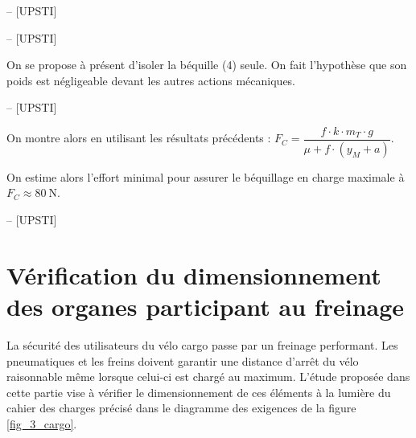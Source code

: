 \ifprof
\begin{corrige}-- [UPSTI]
\end{corrige}
\else
\fi

\ifprof
\begin{corrige}-- [UPSTI]
\end{corrige}
\else
\fi

On se propose à présent d'isoler la béquille (4) seule. On fait l'hypothèse que son poids est négligeable devant les autres actions mécaniques.

\ifprof
\begin{corrige}-- [UPSTI]
\end{corrige}
\else
\fi

On montre alors en utilisant les résultats précédents :
$F_{C}=\dfrac{f \cdot k \cdot m_{T} \cdot g}{\mu+f \cdot\left(y_{M}+a\right)}$.

On estime alors l'effort minimal pour assurer le béquillage en charge maximale à \(F_{C} \approx 80 \mathrm{~N}\).

\ifprof
\begin{corrige}-- [UPSTI]
\end{corrige}
\else
\fi

\section{Vérification du dimensionnement des organes participant au freinage \label{ATS_2024_sec3}}
La sécurité des utilisateurs du vélo cargo passe par un freinage performant. Les pneumatiques et les freins doivent garantir une distance d'arrêt du vélo raisonnable même lorsque celui-ci est chargé au maximum. L'étude proposée dans cette partie vise à vérifier le dimensionnement de ces éléments à la lumière du cahier des charges précisé dans le diagramme des exigences de la figure \ref{fig_3_cargo}.

